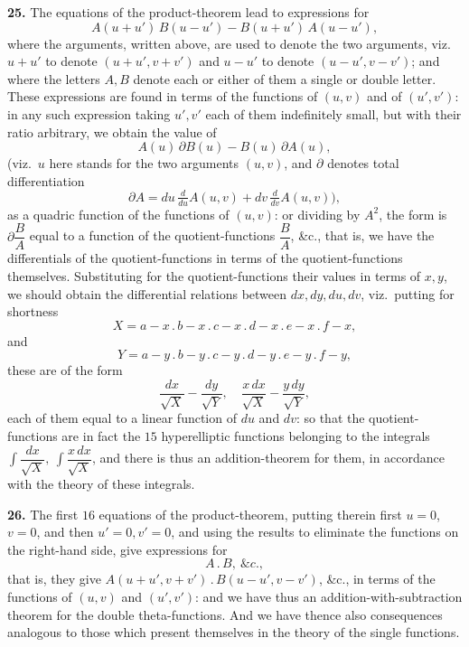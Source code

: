 \documentclass[11pt]{article}
\begin{document}
\textbf{25.} The equations of the product-theorem lead to expressions for
\[
A(u+u')\, B(u-u') - B(u+u')\, A(u-u'),
\]
where the arguments, written above, are used to denote the two arguments, viz.\ $u + u'$ to denote $(u + u', v + v')$ and $u - u'$ to denote $(u - u', v - v')$; and where the letters $A,B$ denote each or either of them a single or double letter. These expressions are found in terms of the functions of $(u,v)$ and of $(u',v')$: in any such expression taking $u',v'$ each of them indefinitely small, but with their ratio arbitrary, we obtain the value of
\[
A(u)\,\partial B(u) - B(u)\,\partial A(u),
\]
(viz.\ $u$ here stands for the two arguments $(u,v)$, and $\partial$ denotes total differentiation
\[
\partial A = du\,\tfrac{d}{du} A(u,v) + dv\,\tfrac{d}{dv} A(u,v)\bigr),
\]
as a quadric function of the functions of $(u,v)$: or dividing by $A^2$, the form is $\partial\dfrac{B}{A}$ equal to a function of the quotient-functions $\dfrac{B}{A}$, \&c., that is, we have the differentials of the quotient-functions in terms of the quotient-functions themselves. Substituting for the quotient-functions their values in terms of $x,y$, we should obtain the differential relations between $dx,dy,du,dv$, viz.\ putting for shortness
\[
X = a - x\mathbin{.}b - x\mathbin{.}c - x\mathbin{.}d - x\mathbin{.}e - x\mathbin{.}f - x,
\]
and
\[
Y = a - y\mathbin{.}b - y\mathbin{.}c - y\mathbin{.}d - y\mathbin{.}e - y\mathbin{.}f - y,
\]
these are of the form
\[
\frac{dx}{\sqrt{X}} - \frac{dy}{\sqrt{Y}},\quad \frac{x\,dx}{\sqrt{X}} - \frac{y\,dy}{\sqrt{Y}},
\]
each of them equal to a linear function of $du$ and $dv$: so that the quotient-functions are in fact the $15$ hyperelliptic functions belonging to the integrals $\int\!\dfrac{dx}{\sqrt{X}},\ \int\!\dfrac{x\,dx}{\sqrt{X}}$, and there is thus an addition-theorem for them, in accordance with the theory of these integrals.

\medskip

\textbf{26.} The first $16$ equations of the product-theorem, putting therein first $u = 0$, $v = 0$, and then $u' = 0, v' = 0$, and using the results to eliminate the functions on the right-hand side, give expressions for
\[
A\mathbin{.}B,\ \&c.,
\]
that is, they give $A(u + u', v + v')\mathbin{.}B(u - u', v - v')$, \&c., in terms of the functions of $(u,v)$ and $(u',v')$: and we have thus an addition-with-subtraction theorem for the double theta-functions. And we have thence also consequences analogous to those which present themselves in the theory of the single functions.
\end{document}
